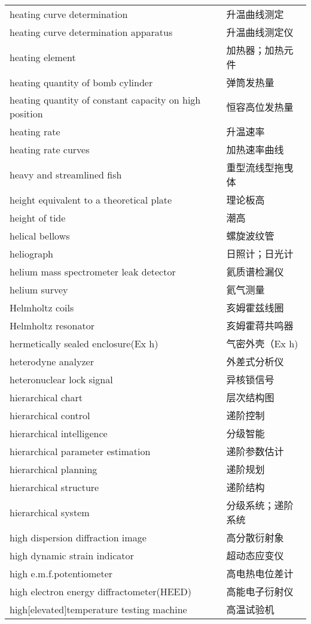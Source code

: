 \documentclass[
]{article}
\begin{document}
\begin{longtable}[]{@{}ll@{}}
heating curve determination & 升温曲线测定 \\
heating curve determination apparatus & 升温曲线测定仪 \\
heating element & 加热器；加热元件 \\
heating quantity of bomb cylinder & 弹筒发热量 \\
heating quantity of constant capacity on high position &
恒容高位发热量 \\
heating rate & 升温速率 \\
heating rate curves & 加热速率曲线 \\
heavy and streamlined fish & 重型流线型拖曳体 \\
height equivalent to a theoretical plate & 理论板高 \\
height of tide & 潮高 \\
helical bellows & 螺旋波纹管 \\
heliograph & 日照计；日光计 \\
helium mass spectrometer leak detector & 氦质谱检漏仪 \\
helium survey & 氦气测量 \\
Helmholtz coils & 亥姆霍兹线圈 \\
Helmholtz resonator & 亥姆霍蒋共鸣器 \\
hermetically sealed enclosure(Ex h) & 气密外壳（Ex h) \\
heterodyne analyzer & 外差式分析仪 \\
heteronuclear lock signal & 异核锁信号 \\
hierarchical chart & 层次结构图 \\
hierarchical control & 递阶控制 \\
hierarchical intelligence & 分级智能 \\
hierarchical parameter estimation & 递阶参数估计 \\
hierarchical planning & 递阶规划 \\
hierarchical structure & 递阶结构 \\
hierarchical system & 分级系统；递阶系统 \\
high dispersion diffraction image & 高分散衍射象 \\
high dynamic strain indicator & 超动态应变仪 \\
high e.m.f.potentiometer & 高电热电位差计 \\
high electron energy diffractometer(HEED) & 高能电子衍射仪 \\
high{[}elevated{]}temperature testing machine & 高温试验机 \\

\end{longtable}
\end{document}
